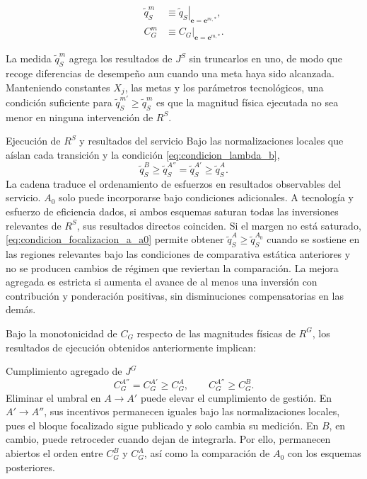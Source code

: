 \begin{subequations}
\label{eq:resultados_agregados_esquema}
\begin{align}
\widetilde q_S^m
&\equiv
\left.
\widetilde q_S
\right|_{\mathbf e=\mathbf e^{m,*}},
\label{eq:resultado_agregado}
\\
C_G^m
&\equiv
C_G
\big|_{\mathbf e=\mathbf e^{m,*}}.
\label{eq:cumplimiento_g_por_esquema}
\end{align}
\end{subequations}

La medida \(\widetilde q_S^m\) agrega los resultados de \(J^{S}\) sin truncarlos en uno, de modo que recoge diferencias de desempeño aun cuando una meta haya sido alcanzada. Manteniendo constantes \(X_j\), las metas y los parámetros tecnológicos, una condición suficiente para \(\widetilde q_S^{m'}\geq \widetilde q_S^m\) es que la magnitud física ejecutada no sea menor en ninguna intervención de \(R^{S}\).

\begin{resultadobox}
{Ejecución de \(R^{S}\) y resultados del servicio}
\label{res:desempeno_agregado}
Bajo las normalizaciones locales que aíslan cada transición y la condición \eqref{eq:condicion_lambda_b},
\begin{equation}
\widetilde q_S^{B}
\geq
\widetilde q_S^{A''}
=
\widetilde q_S^{A'}
\geq
\widetilde q_S^{A}.
\end{equation}
La cadena traduce el ordenamiento de esfuerzos en resultados observables del servicio. \(A_0\) solo puede incorporarse bajo condiciones adicionales. A tecnología y esfuerzo de eficiencia dados, si ambos esquemas saturan todas las inversiones relevantes de \(R^{S}\), sus resultados directos coinciden. Si el margen no está saturado, \eqref{eq:condicion_focalizacion_a_a0} permite obtener \(\widetilde q_S^{A}\geq\widetilde q_S^{A_0}\) cuando se sostiene en las regiones relevantes bajo las condiciones de comparativa estática anteriores y no se producen cambios de régimen que reviertan la comparación. La mejora agregada es estricta si aumenta el avance de al menos una inversión con contribución y ponderación positivas, sin disminuciones compensatorias en las demás.
\end{resultadobox}

Bajo la monotonicidad de \(C_G\) respecto de las magnitudes físicas de \(R^{G}\), los resultados de ejecución obtenidos anteriormente implican:

\begin{resultadobox}
{Cumplimiento agregado de \(J^{G}\)}
\label{res:cumplimiento_agregado_g}
\begin{equation}
C_G^{A''}
=
C_G^{A'}
\geq
C_G^{A},
\qquad
C_G^{A''}
\geq
C_G^{B}.
\end{equation}
Eliminar el umbral en \(A\to A'\) puede elevar el cumplimiento de gestión. En \(A'\to A''\), sus incentivos permanecen iguales bajo las normalizaciones locales, pues el bloque focalizado sigue publicado y solo cambia su medición. En \(B\), en cambio, puede retroceder cuando dejan de integrarla. Por ello, permanecen abiertos el orden entre \(C_G^{B}\) y \(C_G^{A}\), así como la comparación de \(A_0\) con los esquemas posteriores.
\end{resultadobox}

